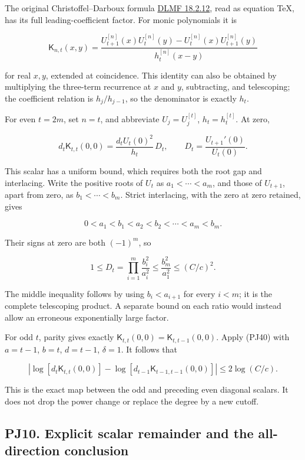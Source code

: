 \documentclass[10pt]{article}
\begin{document}
The original Christoffel--Darboux formula \href{https://dlmf.nist.gov/18.2.E12}{DLMF 18.2.12}, read as equation TeX, has its full leading-coefficient factor. For monic polynomials it is

\[
\mathsf K_{n,t}(x,y)=\frac{U_{t+1}^{[n]}(x)U_t^{[n]}(y)-U_t^{[n]}(x)U_{t+1}^{[n]}(y)}{h_t^{[n]}(x-y)}
\tag{PJ42}
\]

for real \(x,y\), extended at coincidence. This identity can also be obtained by multiplying the three-term recurrence at \(x\) and \(y\), subtracting, and telescoping; the coefficient relation is \(h_j/h_{j-1}\), so the denominator is exactly \(h_t\).

For even \(t=2m\), set \(n=t\), and abbreviate \(U_j=U_j^{[t]}\), \(h_t=h_t^{[t]}\). At zero,

\[
d_t\mathsf K_{t,t}(0,0)
=\frac{d_tU_t(0)^2}{h_t}\,
D_t,\qquad D_t=\frac{U_{t+1}'(0)}{U_t(0)}.
\tag{PJ43}
\]

This scalar has a uniform bound, which requires both the root gap and interlacing. Write the positive roots of \(U_t\) as \(a_1<\cdots<a_m\), and those of \(U_{t+1}\), apart from zero, as \(b_1<\cdots<b_m\). Strict interlacing, with the zero at zero retained, gives

\[
0<a_1<b_1<a_2<b_2<\cdots<a_m<b_m.
\]

Their signs at zero are both \((-1)^m\), so

\[
1\le D_t=\prod_{i=1}^m\frac{b_i^2}{a_i^2}
\le\frac{b_m^2}{a_1^2}\le(C/c)^2.
\tag{PJ44}
\]

The middle inequality follows by using \(b_i<a_{i+1}\) for every \(i<m\); it is the complete telescoping product. A separate bound on each ratio would instead allow an erroneous exponentially large factor.

For odd \(t\), parity gives exactly \(\mathsf K_{t,t}(0,0)=\mathsf K_{t,t-1}(0,0)\). Apply (PJ40) with \(a=t-1\), \(b=t\), \(d=t-1\), \(\delta=1\). It follows that

\[
\left|\log[d_t\mathsf K_{t,t}(0,0)]
-\log[d_{t-1}\mathsf K_{t-1,t-1}(0,0)]\right|
\le2\log(C/c).
\tag{PJ45}
\]

This is the exact map between the odd and preceding even diagonal scalars. It does not drop the power change or replace the degree by a new cutoff.

\subsection{PJ10. Explicit scalar remainder and the all-direction conclusion}\label{pj10.-explicit-scalar-remainder-and-the-all-direction-conclusion}
\end{document}
